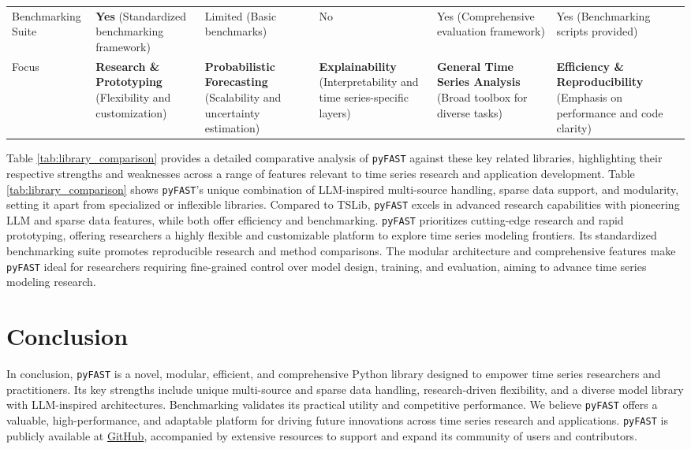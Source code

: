 \documentclass[twoside,11pt]{article}
\begin{document}
\begin{table*}[t!]
{\begin{tabularx}{\textwidth}{@{}p{1.6cm}p{3cm}p{2.1cm}p{2.1cm}p{2.1cm}p{2.1cm}@{}}
    Benchmarking Suite & \textbf{Yes} (Standardized benchmarking framework) & Limited (Basic benchmarks) & No & Yes (Comprehensive evaluation framework) & Yes (Benchmarking scripts provided) \\
    Focus & \textbf{Research \& Prototyping} (Flexibility and customization) & \textbf{Probabilistic Forecasting} (Scalability and uncertainty estimation) & \textbf{Explainability} (Interpretability and time series-specific layers) & \textbf{General Time Series Analysis} (Broad toolbox for diverse tasks) & \textbf{Efficiency \& Reproducibility} (Emphasis on performance and code clarity) \\
    \bottomrule
    \end{tabularx}
    }
\end{table*}
Table \ref{tab:library_comparison} provides a detailed comparative analysis of \texttt{pyFAST} against these key related libraries, highlighting their respective strengths and weaknesses across a range of features relevant to time series research and application development. Table \ref{tab:library_comparison} shows \texttt{pyFAST}'s unique combination of LLM-inspired multi-source handling, sparse data support, and modularity, setting it apart from specialized or inflexible libraries. Compared to TSLib, \texttt{pyFAST} excels in advanced research capabilities with pioneering LLM and sparse data features, while both offer efficiency and benchmarking. \texttt{pyFAST} prioritizes cutting-edge research and rapid prototyping, offering researchers a highly flexible and customizable platform to explore time series modeling frontiers. Its standardized benchmarking suite promotes reproducible research and method comparisons. The modular architecture and comprehensive features make \texttt{pyFAST} ideal for researchers requiring fine-grained control over model design, training, and evaluation, aiming to advance time series modeling research.

\section{Conclusion}
In conclusion, \texttt{pyFAST} is a novel, modular, efficient, and comprehensive Python library designed to empower time series researchers and practitioners.  Its key strengths include unique multi-source and sparse data handling, research-driven flexibility, and a diverse model library with LLM-inspired architectures. Benchmarking validates its practical utility and competitive performance. We believe \texttt{pyFAST} offers a valuable, high-performance, and adaptable platform for driving future innovations across time series research and applications. \texttt{pyFAST} is publicly available at \href{https://github.com/freepose/pyFAST}{GitHub}, accompanied by extensive resources to support and expand its community of users and contributors.

\end{document}
